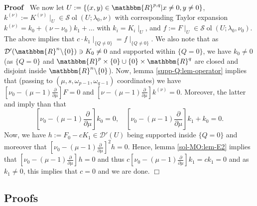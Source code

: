 \documentclass[12pt]{article}
\newcommand{\assign}{:=}
\newcommand{\tmop}[1]{\ensuremath{\operatorname{#1}}}
\renewenvironment{proof}{\noindent\textbf{Proof\ }}{\hspace*{\fill}$\Box$\medskip}
\theoremstyle{remark}
\begin{document}
\begin{proof}
  We now let $U \assign \{ (x, y) \in \mathbbm{R}^{p, q} | x \neq 0, y \neq 0
  \}$, $k^{(\nu)} \assign K^{(\nu)} \mid_U \in \mathcal{S} \tmop{ol} (U ;
  \lambda_0, \nu)$ with corresponding Taylor expansion $k^{(\nu)} = k_0 + (\nu
  - \nu_0) k_1 + \ldots$ with $k_i = K_i \mid_U$, and $f \assign F
  \mid_U \in \mathcal{S} \tmop{ol} (U ; \lambda_0, \nu_0)$. The above
  implies that $c \cdot k_1 \mid_{\{ Q \neq 0 \}} = f \mid_{\{ Q \neq
  0 \}}$. We also note that as $\mathcal{D}' (\mathbbm{R}^n \backslash \{ 0
  \}) \ni K_0 \neq 0$ and supported within $\{ Q = 0 \}$, we have $k_0 \neq 0$
  (as $\{ Q = 0 \}$ and $\mathbbm{R}^p \times \{ 0 \} \cup \{ 0 \} \times
  \mathbbm{R}^q$ are closed and disjoint inside $\mathbbm{R}^n \backslash \{ 0
  \}$). Now, lemma \ref{supp-Q:lem-operator} implies that (passing to $(\mu,
  s, \omega_{p - 1}, \omega_{q - 1})$ coordinates) we have $\left[ \nu_0 -
  (\mu - 1) \frac{\partial}{\partial \mu} \right] F = 0$ and $\left[ \nu -
  (\mu - 1) \frac{\partial}{\partial \mu} \right] k^{(\nu)} = 0$. Moreover,
  the latter and {\cite[lem. 11.10]{kobayashi2015symmetry}} imply than that
  \[ \left[ \nu_0 - (\mu - 1) \frac{\partial}{\partial \mu} \right] k_0 = 0,
     \quad \left[ \nu_0 - (\mu - 1) \frac{\partial}{\partial \mu} \right] k_1
     + k_0 = 0. \]
  Now, we have $h \assign F_0 - c K_1 \in \mathcal{D}' (U)$ being supported
  inside $\{ Q = 0 \}$ and moreover that $\left[ \nu_0 - (\mu - 1)
  \frac{\partial}{\partial \mu} \right]^2 h = 0$. Hence, lemma
  \ref{sol-MO:lem-E2} implies that $\left[ \nu_0 - (\mu - 1)
  \frac{\partial}{\partial \mu} \right]^{} h = 0$ and thus $c \left[ \nu_0 -
  (\mu - 1) \frac{\partial}{\partial \mu} \right] k_1 = c k_1 = 0$ and as $k_1
  \neq 0$, this implies that $c = 0$ and we are done.
\end{proof}

\subsection{Proofs}
\end{document}

